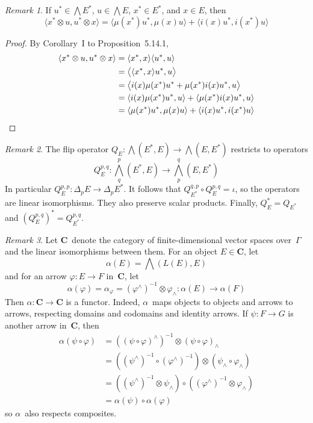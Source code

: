 \documentclass[letterpaper,12pt]{article}
\newcommand{\after}{\circ}
\newcommand{\tprod}{\otimes}
\newcommand{\eprod}{\wedge}
\newcommand{\bigeprod}{\bigwedge}
\newcommand{\medeprod}{{\textstyle\bigeprod}}
\newcommand{\sprod}[2]{\langle#1,#2\rangle}
\newcommand{\bigsprod}[2]{\big\langle#1,#2\big\rangle}
\newcommand{\cat}[1]{\mathbf{#1}}
\theoremstyle{definition}
\theoremstyle{remark}
\newtheorem*{rmk}{Remark}
\begin{document}
\begin{rmk}
If \(u^*\in\medeprod E^*\), \(u\in\medeprod E\), \(x^*\in E^*\), and \(x\in E\), then
\[\sprod{x^*\tprod u}{u^*\tprod x}=\sprod{\mu(x^*)u^*}{\mu(x)u}+\sprod{i(x)u^*}{i(x^*)u}\]
\end{rmk}
\begin{proof}
By Corollary~I to Proposition~5.14.1,
\begin{align*}
\sprod{x^*\tprod u}{u^*\tprod x}&=\sprod{x^*}{x}\sprod{u^*}{u}\\
	&=\bigsprod{\sprod{x^*}{x}u^*}{u}\\
	&=\bigsprod{i(x)\mu(x^*)u^*+\mu(x^*)i(x)u^*}{u}\\
	&=\sprod{i(x)\mu(x^*)u^*}{u}+\sprod{\mu(x^*)i(x)u^*}{u}\\
	&=\sprod{\mu(x^*)u^*}{\mu(x)u}+\sprod{i(x)u^*}{i(x^*)u}\qedhere
\end{align*}
\end{proof}

\begin{rmk}
The flip operator \(Q_E:\medeprod(E^*,E)\to\medeprod(E,E^*)\) restricts to operators
\[Q_E^{p,q}:\medeprod^p_q(E^*,E)\to\medeprod^q_p(E,E^*)\]
In particular \(Q_E^{p,p}:\Delta_p E\to\Delta_p E^*\). It follows that \(Q_{E^*}^{q,p}\after Q_E^{p,q}=\iota\), so the operators are linear isomorphisms. They also preserve scalar products. Finally, \(Q_E^*=Q_{E^*}\) and \((Q_E^{p,q})^*=Q_{E^*}^{p,q}\).
\end{rmk}

\begin{rmk}
Let \(\cat{C}\)~denote the category of finite-dimensional vector spaces over~\(\Gamma\) and the linear isomorphisms between them. For an object \(E\in\cat{C}\), let
\[\alpha(E)=\medeprod(L(E),E)\]
and for an arrow \(\varphi:E\to F\) in~\(\cat{C}\), let
\[\alpha(\varphi)=\alpha_{\varphi}=(\varphi^{\eprod})^{-1}\tprod\varphi_{\eprod}:\alpha(E)\to\alpha(F)\]
Then \(\alpha:\cat{C}\to\cat{C}\) is a functor. Indeed, \(\alpha\)~maps objects to objects and arrows to arrows, respecting domains and codomains and identity arrows. If \(\psi:F\to G\) is another arrow in~\(\cat{C}\), then
\begin{align*}
\alpha(\psi\after\varphi)&=((\psi\after\varphi)^{\eprod})^{-1}\tprod(\psi\after\varphi)_{\eprod}\\
	&=((\psi^{\eprod})^{-1}\after(\varphi^{\eprod})^{-1})\tprod(\psi_{\eprod}\after\varphi_{\eprod})\\
	&=((\psi^{\eprod})^{-1}\tprod\psi_{\eprod})\after((\varphi^{\eprod})^{-1}\tprod\varphi_{\eprod})\\
	&=\alpha(\psi)\after\alpha(\varphi)
\end{align*}
so \(\alpha\)~also respects composites.
\end{rmk}
\end{document}
